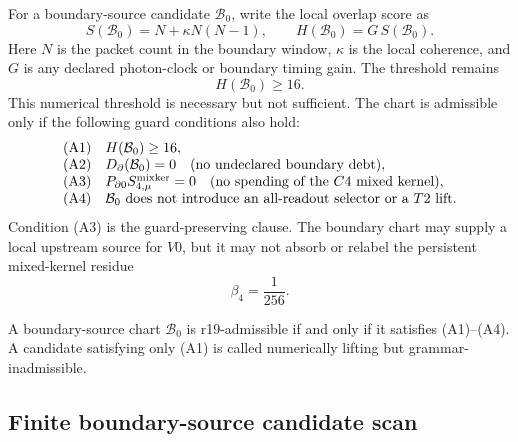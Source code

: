 For a boundary-source candidate \(\mathcal B_0\), write the local overlap score
as
\[
S(\mathcal B_0)
=
N+\kappa N(N-1),
\qquad
H(\mathcal B_0)=G\,S(\mathcal B_0).
\]
Here \(N\) is the packet count in the boundary window, \(\kappa\) is the local
coherence, and \(G\) is any declared photon-clock or boundary timing gain.
The threshold remains
\[
H(\mathcal B_0)\ge 16.
\]
This numerical threshold is necessary but not sufficient.  The chart is
admissible only if the following guard conditions also hold:
\[
\begin{array}{ll}
\text{(A1)} & H(\mathcal B_0)\ge 16,\\
\text{(A2)} & D_{\partial}(\mathcal B_0)=0\quad\text{(no undeclared boundary debt)},\\
\text{(A3)} & P_{\partial0}S_{4,\mu}^{\rm mixker}=0\quad\text{(no spending of the }C4\text{ mixed kernel)},\\
\text{(A4)} & \mathcal B_0\text{ does not introduce an all-readout selector or a }T2\text{ lift.}
\end{array}
\]
Condition (A3) is the guard-preserving clause.  The boundary chart may supply a
local upstream source for \(V0\), but it may not absorb or relabel the persistent
mixed-kernel residue
\[
\beta_4=\frac1{256}.
\]

\begin{definition}
\label{def:v470-r19-boundary-source-admissibility}
A boundary-source chart \(\mathcal B_0\) is r19-admissible if and only if it
satisfies (A1)--(A4).  A candidate satisfying only (A1) is called numerically
lifting but grammar-inadmissible.
\end{definition}

\subsection{Finite boundary-source candidate scan}
\label{subsec:v470-r19-boundary-source-candidate-scan}


